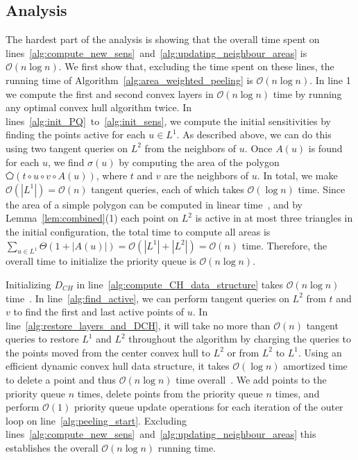 \documentclass{cccg24}
\newcommand{\Oh}[1]{\mathcal{O}\!\lrParents{#1}}
\newcommand{\OhTheta}[1]{\Theta\!\lrParents{#1}}
\newcommand{\lrParents}[1]{\left( #1 \right)}
\newcommand{\lrSize}[1]{\left| #1 \right|}
\newcommand{\logn}{\log{n}}
\newcommand{\sens}[1]{\sigma\!\lrParents{#1}}
\newcommand{\poly}[1]{\pentagon\!\lrParents{#1}}
\begin{document}
\subsection{Analysis}
The hardest part of the analysis is showing that the overall time spent on lines~\ref{alg:compute_new_sens}~and~\ref{alg:updating_neighbour_areas} is $\Oh{n\log n}$. 
We first show that, excluding the time spent on these lines, the running time of Algorithm~\ref{alg:area_weighted_peeling} is $\Oh{n \logn}$. 
In line 1 we compute the first and second convex layers in $\Oh{n\log{n}}$ time by running any optimal convex hull algorithm twice. 
In lines~\ref{alg:init_PQ}~to~\ref{alg:init_sens}, we compute the initial sensitivities by finding the points active for each $u \in L^1$. 
As described above, we can do this using two tangent queries on $L^2$ from the neighbors of $u$. 
Once $A(u)$ is found for each $u$, we find $\sens{u}$ by computing the area of the polygon $\poly{t \circ u \circ v \circ A(u)}$, where $t$ and $v$ are the neighbors of $u$. 
In total, we make $\Oh{|L^1|} = \Oh{n}$ tangent queries, each of which takes $\Oh{\log n}$ time. 
Since the area of a simple polygon can be computed in linear time~\cite{meister1769generalia}, and by Lemma~\ref{lem:combined}(1) each point on $L^2$ is active in at most three triangles in the initial configuration, the total time to compute all areas is $\sum_{u \in L^1} \OhTheta{1 + \lrSize{A(u)}} = \Oh{\lrSize{L^1} + \lrSize{L^2}} = \Oh{n}$ time. %
Therefore, the overall time to initialize the priority queue is $\Oh{n\log n}$. 

Initializing $D_{CH}$ in line~\ref{alg:compute_CH_data_structure} takes $\Oh{n\log n}$ time~\cite{1992_hershberger_semi_dynamic_CH}. 
In line~\ref{alg:find_active}, we can perform tangent queries on $L^2$ from $t$ and $v$ to find the first and last active points of $u$.
In line~\ref{alg:restore_layers_and_DCH}, it will take no more than $\Oh{n}$ tangent queries to restore $L^1$ and $L^2$ throughout the algorithm by charging the queries to the points moved from the center convex hull to $L^2$ or from $L^2$ to $L^1$. %
Using an efficient dynamic convex hull data structure, it takes $\Oh{\log n}$ amortized time to delete a point and thus $\Oh{n\logn}$ time overall~\cite{1992_hershberger_semi_dynamic_CH, 2002_brodal_rico_dynamic_CH}. 
We add points to the priority queue $n$ times, delete points from the priority queue $n$ times, and perform $\Oh{1}$ priority queue update operations for each iteration of the outer loop on line~\ref{alg:peeling_start}. 
Excluding lines~\ref{alg:compute_new_sens}~and~\ref{alg:updating_neighbour_areas} this establishes the overall $\Oh{n\logn}$ running time.
\end{document}
